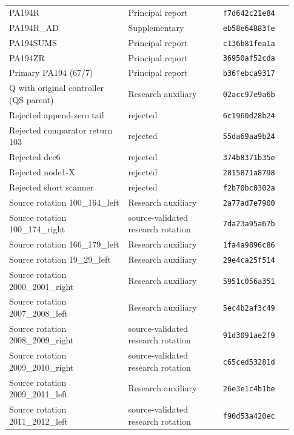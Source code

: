 \begin{longtable}{@{}p{0.39\linewidth}p{0.31\linewidth}p{0.23\linewidth}@{}}
PA194R & Principal report & \texttt{f7d642c21e84}\\[3pt]
PA194R\_\allowbreak{}AD & Supplementary & \texttt{eb58e64883fe}\\[3pt]
PA194SUMS & Principal report & \texttt{c136b81fea1a}\\[3pt]
PA194ZR & Principal report & \texttt{36950af52cda}\\[3pt]
Primary PA194 (67/7) & Principal report & \texttt{b36febca9317}\\[3pt]
Q with original controller (QS parent) & Research auxiliary & \texttt{02acc97e9a6b}\\[3pt]
Rejected append-zero tail & rejected & \texttt{6c1960d28b24}\\[3pt]
Rejected comparator return 103 & rejected & \texttt{55da69aa9b24}\\[3pt]
Rejected dec6 & rejected & \texttt{374b8371b35e}\\[3pt]
Rejected node1-X & rejected & \texttt{2815871a8798}\\[3pt]
Rejected short scanner & rejected & \texttt{f2b70bc0302a}\\[3pt]
Source rotation 100\_\allowbreak{}164\_\allowbreak{}left & Research auxiliary & \texttt{2a77ad7e7900}\\[3pt]
Source rotation 100\_\allowbreak{}174\_\allowbreak{}right & source-validated research rotation & \texttt{7da23a95a67b}\\[3pt]
Source rotation 166\_\allowbreak{}179\_\allowbreak{}left & Research auxiliary & \texttt{1fa4a9896c86}\\[3pt]
Source rotation 19\_\allowbreak{}29\_\allowbreak{}left & Research auxiliary & \texttt{29e4ca25f514}\\[3pt]
Source rotation 2000\_\allowbreak{}2001\_\allowbreak{}right & Research auxiliary & \texttt{5951c056a351}\\[3pt]
Source rotation 2007\_\allowbreak{}2008\_\allowbreak{}left & Research auxiliary & \texttt{5ec4b2af3c49}\\[3pt]
Source rotation 2008\_\allowbreak{}2009\_\allowbreak{}right & source-validated research rotation & \texttt{91d3091ae2f9}\\[3pt]
Source rotation 2009\_\allowbreak{}2010\_\allowbreak{}right & source-validated research rotation & \texttt{c65ced53281d}\\[3pt]
Source rotation 2009\_\allowbreak{}2011\_\allowbreak{}left & Research auxiliary & \texttt{26e3e1c4b1be}\\[3pt]
Source rotation 2011\_\allowbreak{}2012\_\allowbreak{}left & source-validated research rotation & \texttt{f90d53a420ec}\\[3pt]

\end{longtable}
